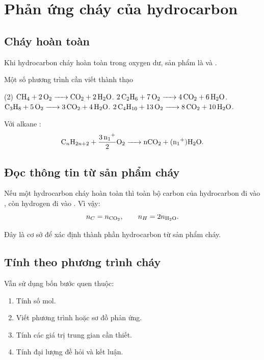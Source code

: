 \section{Phản ứng cháy của hydrocarbon}

\subsection{Cháy hoàn toàn}

Khi hydrocarbon cháy hoàn toàn trong oxygen dư, sản phẩm là  và .

\begin{ghinho}{Một số phương trình cần viết thành thạo}
\begin{tasks}(2)
\task $\ce{CH4 + 2O2 -> CO2 + 2H2O}$.
\task $\ce{2C2H6 + 7O2 -> 4CO2 + 6H2O}$.
\task $\ce{C3H8 + 5O2 -> 3CO2 + 4H2O}$.
\task $\ce{2C4H10 + 13O2 -> 8CO2 + 10H2O}$.
\end{tasks}
\end{ghinho}

Với alkane :
\[
\ce{C_nH_{2n+2} + \frac{3n+1}{2}O2 -> nCO2 + (n+1)H2O}.
\]

\subsection{Đọc thông tin từ sản phẩm cháy}

Nếu một hydrocarbon cháy hoàn toàn thì toàn bộ carbon của hydrocarbon đi vào , còn hydrogen đi vào . Vì vậy:
\[
n_C=n_{\ce{CO2}},\qquad n_H=2n_{\ce{H2O}}.
\]

Đây là cơ sở để xác định thành phần hydrocarbon từ sản phẩm cháy.

\subsection{Tính theo phương trình cháy}

Vẫn sử dụng bốn bước quen thuộc:
\begin{enumerate}
\item Tính số mol.
\item Viết phương trình hoặc sơ đồ phản ứng.
\item Tính các giá trị trung gian cần thiết.
\item Tính đại lượng đề hỏi và kết luận.
\end{enumerate}

